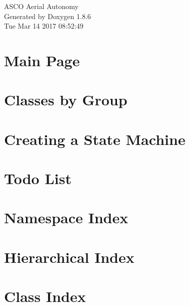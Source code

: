 \documentclass[twoside]{book}
\newcommand{\clearemptydoublepage}{%
  \newpage{\pagestyle{empty}\cleardoublepage}%
}
\begin{document}
\hypersetup{pageanchor=false}
\begin{titlepage}
\vspace*{7cm}
\begin{center}%
{\Large A\-S\-C\-O Aerial Autonomy }\\
\vspace*{1cm}
{\large Generated by Doxygen 1.8.6}\\
\vspace*{0.5cm}
{\small Tue Mar 14 2017 08:52:49}\\
\end{center}
\end{titlepage}
\clearemptydoublepage
\tableofcontents
\clearemptydoublepage
{}
\hypersetup{pageanchor=true}

\chapter{Main Page}
\label{index}\hypertarget{index}{}
\chapter{Classes by Group}
\label{md_markdown_scripts_class_groups}
\hypertarget{md_markdown_scripts_class_groups}{}

\chapter{Creating a State Machine}
\label{md_markdown_scripts_creating_state_machine}
\hypertarget{md_markdown_scripts_creating_state_machine}{}

\chapter{Todo List}
\label{todo}
\hypertarget{todo}{}

\chapter{Namespace Index}

\chapter{Hierarchical Index}

\chapter{Class Index}

\end{document}
